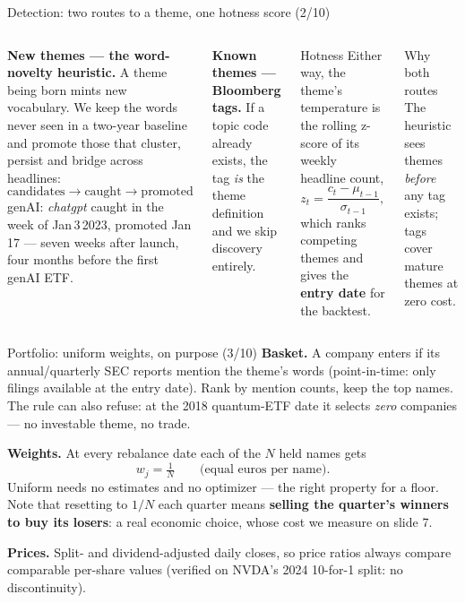 \documentclass[10pt,aspectratio=169]{beamer}
\newcommand{\gd}[1]{\textcolor{good}{#1}}
\begin{document}
\begin{frame}[t]{Detection: two routes to a theme, one hotness score (2/10)}
  \footnotesize
  \begin{columns}[T,onlytextwidth]
      \textbf{New themes --- the word-novelty heuristic.} A theme being born mints new
      vocabulary. We keep the words never seen in a two-year baseline and promote those that
      cluster, persist and bridge across headlines:
      \[
        \text{candidates} \to \text{caught} \to \text{promoted}
      \]
      \gd{genAI: \emph{chatgpt} caught in the week of Jan\,3\,2023, promoted Jan\,17 ---
      seven weeks after launch, four months before the first genAI ETF.}

      \vspace{0.15cm}
      \textbf{Known themes --- Bloomberg tags.} If a topic code already exists, the tag
      \emph{is} the theme definition and we skip discovery entirely.
      \begin{block}{Hotness}
        \scriptsize
        Either way, the theme's temperature is the rolling z-score of its weekly headline
        count,
        \[
          z_t = \frac{c_t - \mu_{t-1}}{\sigma_{t-1}},
        \]
        which ranks competing themes and gives the \textbf{entry date} for the backtest.
      \end{block}
      \begin{block}{Why both routes}
        \scriptsize
        The heuristic sees themes \emph{before} any tag exists; tags cover mature themes at
        zero cost.
      \end{block}
  \end{columns}
\end{frame}

\begin{frame}[t]{Portfolio: uniform weights, on purpose (3/10)}
  \footnotesize
  \textbf{Basket.} A company enters if its annual/quarterly SEC reports mention the theme's
  words (point-in-time: only filings available at the entry date). Rank by mention counts,
  keep the top names. The rule can also refuse: \gd{at the 2018 quantum-ETF date it selects
  \emph{zero} companies --- no investable theme, no trade.}

  \vspace{0.25cm}
  \textbf{Weights.} At every rebalance date each of the $N$ held names gets
  \[
    w_j = \tfrac{1}{N} \qquad \text{(equal euros per name).}
  \]
  Uniform needs no estimates and no optimizer --- the right property for a floor. Note that
  resetting to $1/N$ each quarter means \textbf{selling the quarter's winners to buy its
  losers}: a real economic choice, whose cost we measure on slide 7.

  \vspace{0.25cm}
  \textbf{Prices.} Split- and dividend-adjusted daily closes, so price ratios always compare
  comparable per-share values (verified on NVDA's 2024 10-for-1 split: no discontinuity).
\end{frame}
\end{document}
